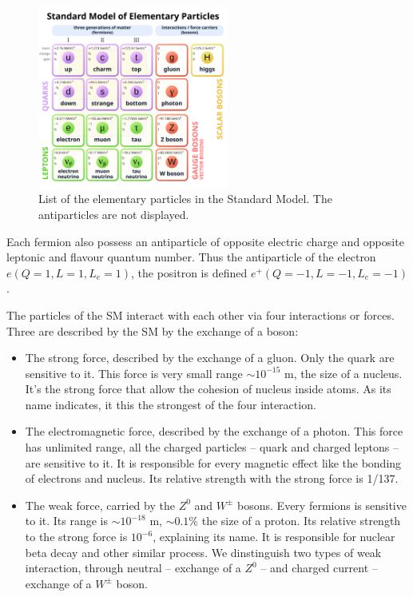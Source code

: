 \begin{figure}
  \centering
  \includegraphics[height=6cm]{images/neutrinos/sm.png}
  \caption{List of the elementary particles in the Standard Model. The antiparticles are not displayed.}
  \label{fig:neutrino:sm}
\end{figure}

Each fermion also possess an antiparticle of opposite electric charge and opposite leptonic and flavour quantum number. Thus the antiparticle of the electron $e (Q=1, L=1, L_e=1)$, the positron is defined $e^+ (Q=-1, L=-1, L_e=-1)$.

The particles of the SM interact with each other via four interactions or forces. Three are described by the SM by the exchange of a boson:
\begin{itemize}
  \item The strong force, described by the exchange of a gluon. Only the quark are sensitive to it. This force is very small range $\sim 10^{-15}$ m, the size of a nucleus. It's the strong force that allow the cohesion of nucleus inside atoms. As its name indicates, it this the strongest of the four interaction.
  \item The electromagnetic force, described by the exchange of a photon. This force has unlimited range, all the charged particles -- quark and charged leptons -- are sensitive to it. It is responsible for every magnetic effect like the bonding of electrons and nucleus. Its relative strength with the strong force is 1/137.
  \item The weak force, carried by the $Z^0$ and $W^{\pm}$ bosons. Every fermions is sensitive to it. Its range is $\sim 10^{-18}$ m, $\sim 0.1\%$ the size of a proton. Its relative strength to the strong force is $10^{-6}$, explaining its name. It is responsible for nuclear beta decay and other similar process. We dinstinguish two types of weak interaction, through neutral -- exchange of a $Z^0$ -- and charged current -- exchange of a $W^{\pm}$ boson.
\end{itemize}

